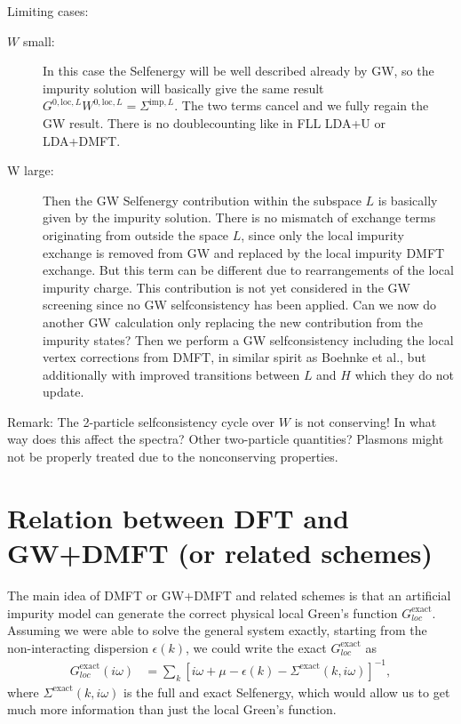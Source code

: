 \documentclass[12pt,a4paper]{scrartcl}
\numberwithin{equation}{section}
\newcommand{\cng}[1]{{\color{red}#1}}
\begin{document}
Limiting cases:
\begin{description}
\item[$W$ small:] In this case the Selfenergy will be well described already by GW, so the impurity solution
will basically give the same result $G^{0,\mathrm{loc},L}W^{0,\mathrm{loc},L} = \Sigma^{\mathrm{imp},L}$.
The two terms cancel and we fully regain the GW result. There is no doublecounting like in FLL LDA+U or LDA+DMFT.
\item[W large:] Then the GW Selfenergy contribution within the subspace $L$ is basically given by the impurity solution.
There is no mismatch of exchange terms originating from outside the space $L$, since only the local impurity exchange
is removed from GW and replaced by the local impurity DMFT exchange. But this term can be different due to rearrangements
of the local impurity charge. This contribution is not yet considered in the GW screening since no GW selfconsistency
has been applied.
\cng{Can we now do another GW calculation only replacing the new contribution from the impurity states?
Then we perform a GW selfconsistency including the  local vertex corrections from DMFT, in similar spirit as Boehnke et al., but additionally with improved transitions between
$L$ and $H$ which they do not update.}
\end{description}
Remark: The 2-particle selfconsistency cycle over $W$ is not conserving! In what way
does this affect the spectra? Other two-particle quantities?
Plasmons might not be properly treated due to the nonconserving
properties.

\section{Relation between DFT and GW+DMFT (or related schemes)}
The main idea of DMFT or GW+DMFT and related schemes is that an artificial impurity model
can generate the correct physical local Green's function $G^{\mathrm{exact}}_{loc}$.
Assuming we were able to solve the general system exactly, starting from the non-interacting
dispersion $\epsilon(k)$, we could write the exact $G^{\mathrm{exact}}_{loc}$ as
\begin{align}
 G^{\mathrm{exact}}_{loc}(i\omega)
 &= \sum_{k} \left[ i\omega + \mu - \epsilon(k) - \Sigma^{\mathrm{exact}}(k,i\omega) \right]^{-1},
\end{align}
where $\Sigma^{\mathrm{exact}}(k,i\omega)$ is the full and exact Selfenergy, which would allow
us to get much more information than just the local Green's function.
\end{document}
